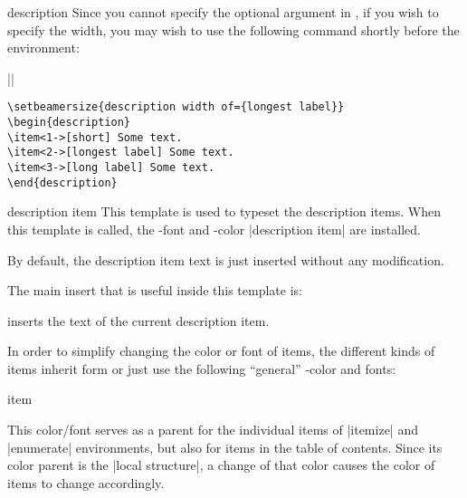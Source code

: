 \begin{environment}{{description}}
  \lyxnote
  Since you cannot specify the optional argument in \LyX, if you wish
  to specify the width, you may wish to use the following command
  shortly before the environment:

  ||

  \example
\begin{verbatim}
\setbeamersize{description width of={longest label}}
\begin{description}
\item<1->[short] Some text.
\item<2->[longest label] Some text.
\item<3->[long label] Some text.
\end{description}
\end{verbatim}

  \begin{element}{description item}\yes\yes\yes
    This template is used to typeset the description items. When this
    template is called, the \beamer-font and -color |description item|
    are installed.

    \begin{templateoptions}
      By default, the description item text is just inserted without
      any modification.
    \end{templateoptions}

    The main insert that is useful inside this template is:
    \begin{templateinserts}
      \iteminsert{\insertdescriptionitem} inserts the text of the
      current description item.
    \end{templateinserts}
  \end{element}
\end{environment}



In order to simplify changing the color or font of items, the
different kinds of items inherit form or just use the following
``general'' \beamer-color and fonts:

\begin{element}{item}\no\yes\yes

  This color/font serves as a parent for the individual items of
  |itemize| and |enumerate| environments, but also for items in the
  table of contents. Since its color parent is the |local structure|,
  a change of that color causes the color of items to change
  accordingly.
\end{element}

